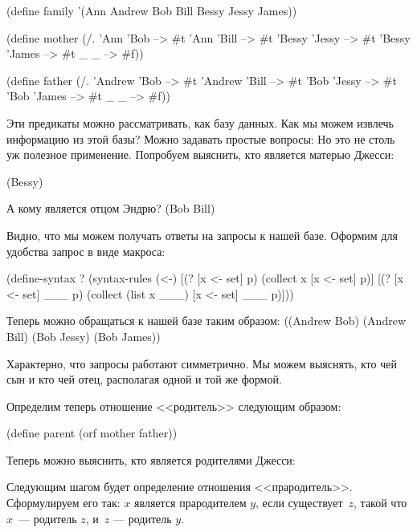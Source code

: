 \begin{Definition}
(define family '(Ann Andrew Bob Bill Bessy Jessy James))

(define mother
  (/. 'Ann 'Bob --> #t
      'Ann 'Bill --> #t
      'Bessy 'Jessy --> #t
      'Bessy 'James --> #t
      _ _ --> #f))

(define father
  (/. 'Andrew 'Bob --> #t
      'Andrew 'Bill --> #t
      'Bob 'Jessy --> #t
      'Bob 'James --> #t
      _ _ --> #f))
\end{Definition}
Эти предикаты можно рассматривать, как базу данных. Как мы можем извлечь информацию из этой базы? Можно задавать простые вопросы:
Но это не столь уж полезное применение. Попробуем выяснить, кто является матерью Джесси:

     {(Bessy)}

А кому является отцом Эндрю?
     {(Bob Bill)}

Видно, что мы можем получать ответы на запросы к нашей базе. Оформим для удобства запрос в виде макроса:
  
\begin{Definition}[emph={p,x,set}]
(define-syntax ?
  (syntax-rules (<-)
    [(? [x <- set] p) (collect x [x <- set] p)]
    [(? [x <- set] ___ p) (collect (list x ___)
                            [x <- set] ___ p)]))
\end{Definition}

Теперь можно обращаться к нашей базе таким образом:
{((Andrew Bob) (Andrew Bill) (Bob Jessy) (Bob James))}

Характерно, что запросы работают симметрично. Мы можем выяснять, кто чей сын и кто чей отец, располагая одной и той же формой.

Определим теперь отношение <<родитель>> следующим образом:
\begin{Definition}[emph={x,y}]
(define parent (orf mother father))
\end{Definition}
Теперь можно выяснить, кто является родителями Джесси:

Следующим шагом будет определение отношения <<прародитель>>. Сформулируем его так: $x$ является прародителем $y$, если существует~$z$, такой что $x$~--- родитель $z$, и~$z$ --- родитель $y$. 

